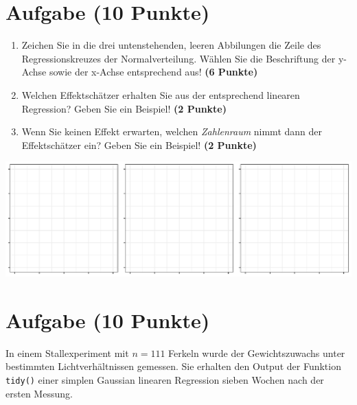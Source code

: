 \documentclass[a4paper, 10pt]{scrartcl}\usepackage[]{graphicx}\usepackage[]{xcolor}
\makeatletter
\def\maxwidth{ %
  \ifdim\Gin@nat@width>\linewidth
    \linewidth
  \else
    \Gin@nat@width
  \fi
}
\makeatother
\begin{document}
\vspace{1Ex}

 
\clearpage

\section{Aufgabe \hfill (10 Punkte)}



\begin{enumerate}
\item Zeichen Sie in die drei untenstehenden, leeren Abbilungen die Zeile des
  Regressionskreuzes der Normalverteilung. W{\"a}hlen Sie die Beschriftung der
  y-Achse sowie der x-Achse entsprechend aus! \textbf{(6 Punkte)}
\item Welchen Effektsch{\"a}tzer erhalten Sie aus der entsprechend linearen
  Regression? Geben Sie ein Beispiel! \textbf{(2 Punkte)}
\item Wenn Sie keinen Effekt erwarten, welchen \textit{Zahlenraum} nimmt dann
  der Effektsch{\"a}tzer ein? Geben Sie ein Beispiel! \textbf{(2 Punkte)}
\end{enumerate}



{\centering \includegraphics[width=\maxwidth]{img/regression-01-1} 

}



 
\clearpage

\section{Aufgabe \hfill (10 Punkte)}



In einem Stallexperiment mit $n = 111$ Ferkeln wurde der
Gewichtszuwachs unter bestimmten Lichtverh{\"a}ltnissen gemessen. Sie erhalten
den \Rlogo Output der Funktion \texttt{tidy()} einer simplen Gaussian linearen
Regression sieben Wochen nach der ersten Messung.
\end{document}
